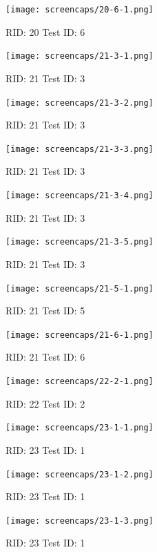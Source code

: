 \documentclass{article}
\begin{document}
\begin{figure}[H]
\texttt{[image: screencaps/20-6-1.png]}
\caption{RID: 20 Test ID: 6}
\end{figure}



\begin{figure}[H]
\texttt{[image: screencaps/21-3-1.png]}
\caption{RID: 21 Test ID: 3}
\end{figure}

\begin{figure}[H]
\texttt{[image: screencaps/21-3-2.png]}
\caption{RID: 21 Test ID: 3}
\end{figure}



\begin{figure}[H]
\texttt{[image: screencaps/21-3-3.png]}
\caption{RID: 21 Test ID: 3}
\end{figure}

\begin{figure}[H]
\texttt{[image: screencaps/21-3-4.png]}
\caption{RID: 21 Test ID: 3}
\end{figure}


\begin{figure}[H]
\texttt{[image: screencaps/21-3-5.png]}
\caption{RID: 21 Test ID: 3}
\end{figure}



\begin{figure}[H]
\texttt{[image: screencaps/21-5-1.png]}
\caption{RID: 21 Test ID: 5}
\end{figure}

\begin{figure}[H]
\texttt{[image: screencaps/21-6-1.png]}
\caption{RID: 21 Test ID: 6}
\end{figure}



\begin{figure}[H]
\texttt{[image: screencaps/22-2-1.png]}
\caption{RID: 22 Test ID: 2}
\end{figure}



\begin{figure}[H]
\texttt{[image: screencaps/23-1-1.png]}
\caption{RID: 23 Test ID: 1}
\end{figure}

\begin{figure}[H]
\texttt{[image: screencaps/23-1-2.png]}
\caption{RID: 23 Test ID: 1}
\end{figure}

\begin{figure}[H]
\texttt{[image: screencaps/23-1-3.png]}
\caption{RID: 23 Test ID: 1}
\end{figure}





\end{document}
